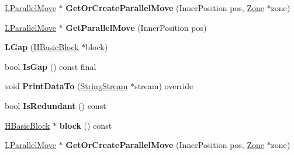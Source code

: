 \begin{DoxyCompactItemize}
\item 
\hyperlink{classv8_1_1internal_1_1_l_parallel_move}{L\+Parallel\+Move} $\ast$ {\bfseries Get\+Or\+Create\+Parallel\+Move} (Inner\+Position pos, \hyperlink{classv8_1_1internal_1_1_zone}{Zone} $\ast$zone)\hypertarget{classv8_1_1internal_1_1_l_gap_afa07f91a1bdbab70770e57c45a4c93cd}{}\label{classv8_1_1internal_1_1_l_gap_afa07f91a1bdbab70770e57c45a4c93cd}

\item 
\hyperlink{classv8_1_1internal_1_1_l_parallel_move}{L\+Parallel\+Move} $\ast$ {\bfseries Get\+Parallel\+Move} (Inner\+Position pos)\hypertarget{classv8_1_1internal_1_1_l_gap_a80a7bd7cd4beef3be42928544646c5fb}{}\label{classv8_1_1internal_1_1_l_gap_a80a7bd7cd4beef3be42928544646c5fb}

\item 
{\bfseries L\+Gap} (\hyperlink{classv8_1_1internal_1_1_h_basic_block}{H\+Basic\+Block} $\ast$block)\hypertarget{classv8_1_1internal_1_1_l_gap_a065fcd3080fabb91cccfc541f7cf90f0}{}\label{classv8_1_1internal_1_1_l_gap_a065fcd3080fabb91cccfc541f7cf90f0}

\item 
bool {\bfseries Is\+Gap} () const  final\hypertarget{classv8_1_1internal_1_1_l_gap_ae74844feaf20986b3e1f0c6e6da350f8}{}\label{classv8_1_1internal_1_1_l_gap_ae74844feaf20986b3e1f0c6e6da350f8}

\item 
void {\bfseries Print\+Data\+To} (\hyperlink{classv8_1_1internal_1_1_string_stream}{String\+Stream} $\ast$stream) override\hypertarget{classv8_1_1internal_1_1_l_gap_ad22b85643ee0ccf9a50f8cc0e73abc19}{}\label{classv8_1_1internal_1_1_l_gap_ad22b85643ee0ccf9a50f8cc0e73abc19}

\item 
bool {\bfseries Is\+Redundant} () const \hypertarget{classv8_1_1internal_1_1_l_gap_afd74524d060224489b5e7095e3354e1e}{}\label{classv8_1_1internal_1_1_l_gap_afd74524d060224489b5e7095e3354e1e}

\item 
\hyperlink{classv8_1_1internal_1_1_h_basic_block}{H\+Basic\+Block} $\ast$ {\bfseries block} () const \hypertarget{classv8_1_1internal_1_1_l_gap_a14ee6777d69e95f0c17ce3dcc0c6431e}{}\label{classv8_1_1internal_1_1_l_gap_a14ee6777d69e95f0c17ce3dcc0c6431e}

\item 
\hyperlink{classv8_1_1internal_1_1_l_parallel_move}{L\+Parallel\+Move} $\ast$ {\bfseries Get\+Or\+Create\+Parallel\+Move} (Inner\+Position pos, \hyperlink{classv8_1_1internal_1_1_zone}{Zone} $\ast$zone)\hypertarget{classv8_1_1internal_1_1_l_gap_afa07f91a1bdbab70770e57c45a4c93cd}{}\label{classv8_1_1internal_1_1_l_gap_afa07f91a1bdbab70770e57c45a4c93cd}


\end{DoxyCompactItemize}
